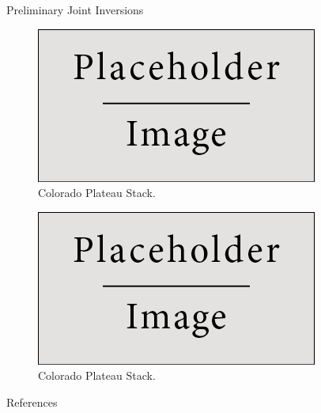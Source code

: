 \documentclass[final]{beamer}
\newlength{\onecolwid}
\begin{document}
\begin{frame}[t]
\begin{columns}[t]
\begin{column}{\onecolwid}
\begin{block}{Preliminary Joint Inversions}
\begin{itemize}
\end{itemize}

\begin{figure}
\includegraphics{img/placeholder.jpg}
\caption{Colorado Plateau Stack.}
\end{figure}

\begin{figure}
\includegraphics{img/placeholder.jpg}
\caption{Colorado Plateau Stack.}
\end{figure}


\end{block}


\begin{block}{References}


\nocite{*} %
\tiny{
\vspace{0.75in}}

\end{block}




\end{column}
\end{columns}
\end{frame}
\end{document}
